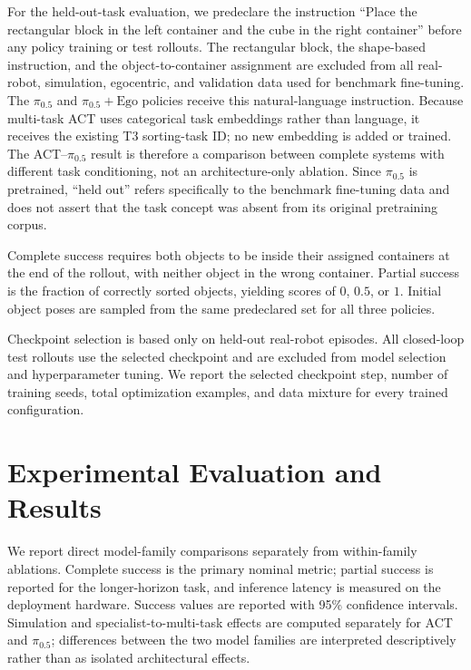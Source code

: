 \documentclass[10pt,conference]{IEEEtran}
\begin{document}
For the held-out-task evaluation, we predeclare the instruction ``Place the
rectangular block in the left container and the cube in the right container''
before any policy training or test rollouts. The rectangular block, the
shape-based instruction, and the object-to-container assignment are excluded
from all real-robot, simulation, egocentric, and validation data used for
benchmark fine-tuning. The $\pi_{0.5}$ and $\pi_{0.5}+\mathrm{Ego}$ policies
receive this natural-language instruction. Because multi-task ACT uses
categorical task embeddings rather than language, it receives the existing T3
sorting-task ID; no new embedding is added or trained. The ACT--$\pi_{0.5}$
result is therefore a comparison between complete systems with different task
conditioning, not an architecture-only ablation. Since $\pi_{0.5}$ is
pretrained, ``held out'' refers specifically to the benchmark fine-tuning data
and does not assert that the task concept was absent from its original
pretraining corpus.

Complete success requires both objects to be inside their assigned containers
at the end of the rollout, with neither object in the wrong container. Partial
success is the fraction of correctly sorted objects, yielding scores of $0$,
$0.5$, or $1$. Initial object poses are sampled from the same predeclared
set for all three policies.

Checkpoint selection is based only on held-out real-robot episodes. All
closed-loop test rollouts use the selected checkpoint and are excluded from
model selection and hyperparameter tuning. We report the selected checkpoint
step, number of training seeds, total optimization examples, and data mixture
for every trained configuration.

\section{Experimental Evaluation and Results}
\label{sec:results}

We report direct model-family comparisons separately from within-family
ablations. Complete success is the primary nominal metric; partial success is
reported for the longer-horizon task, and inference latency is measured on the deployment
hardware. Success values are reported with 95\% confidence intervals.
Simulation and specialist-to-multi-task effects are computed separately for ACT
and $\pi_{0.5}$; differences between the two model families are interpreted
descriptively rather than as isolated architectural effects.
\end{document}
